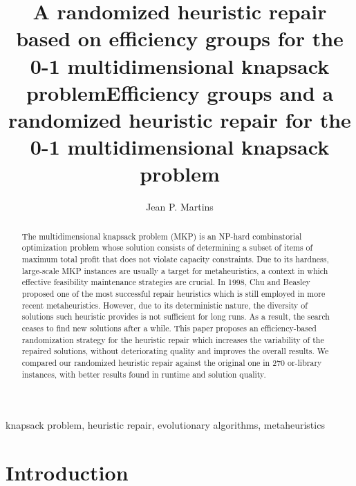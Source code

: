 \documentclass[3p,authoryear]{elsarticle}
\newcommand{\Orlib}{{\sc or-library}\xspace}
\begin{document}
\begin{frontmatter}
\title{A randomized heuristic repair based on efficiency groups for the 0-1 multidimensional knapsack problem}

\title{Efficiency groups and a randomized heuristic repair for the 0-1 multidimensional knapsack problem}

\author{Jean P. Martins}



\address{Federal University of Technology Paran\'a, Academic Department of Informatics, Pato Branco--PR, Brazil}
%
%
%
%
%
\begin{abstract}
The multidimensional knapsack problem (MKP) is an NP-hard combinatorial optimization problem whose solution consists of determining a subset of items of maximum total profit that does not violate capacity constraints. Due to its hardness, large-scale MKP instances are usually a target for metaheuristics, a context in which effective feasibility maintenance strategies are crucial. In 1998, Chu and Beasley proposed one of the most successful repair heuristics which is still employed in more recent metaheuristics. However, due to its deterministic nature, the diversity of solutions such heuristic provides is not sufficient for long runs. As a result, the search ceases to find new solutions after a while. This paper proposes an efficiency-based randomization strategy for the heuristic repair which increases the variability of the repaired solutions, without deteriorating quality and improves the overall results. We compared our randomized heuristic repair against the original one in 270 \Orlib instances, with better results found in runtime and solution quality. 
\end{abstract}
%
%
%
%
%
\begin{keyword}
knapsack problem, heuristic repair, evolutionary algorithms, metaheuristics
\end{keyword}

\end{frontmatter} 
\glsresetall 
\newcommand{\x}{\boldsymbol{x}}

\section{Introduction} 


%
%
\end{document}
